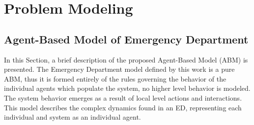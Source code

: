 \documentclass[11pt]{article} %
\begin{document}
\section{Problem Modeling}
\label{sec:pm}

\subsection{Agent-Based Model of Emergency Department}
\label{ssec:ed-mdl}

In this Section, a brief description of the proposed Agent-Based Model (ABM) is presented. The Emergency Department model defined by this work is a pure ABM, thus it is formed entirely of the rules governing the behavior of the individual agents which populate the system, no higher level behavior is modeled. The system behavior emerges as a result of local level actions and interactions. This model describes the complex dynamics found in an ED, representing each individual and system as an individual agent. 
\end{document}
